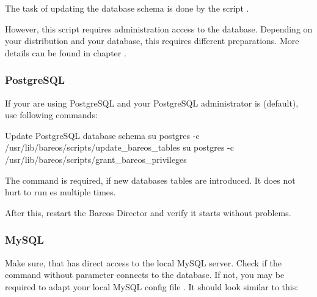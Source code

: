 The task of updating the database schema is done by the script
.

However, this script requires administration access to the database.
Depending on your distribution and your database, this requires different preparations.
More details can be found in chapter .


\subsubsection{PostgreSQL}
If your are using PostgreSQL and your PostgreSQL administrator is  (default), use following commands:

\begin{commands}{Update PostgreSQL database schema}
su postgres -c /usr/lib/bareos/scripts/update_bareos_tables
su postgres -c /usr/lib/bareos/scripts/grant_bareos_privileges
\end{commands}

The  command is required, if new databases tables are introduced. It does not hurt to run es multiple times.

After this, restart the Bareos Director and verify it starts without problems.

\subsubsection{MySQL}
Make sure, that  has direct access to the local MySQL server.
Check if the command  without parameter connects to the database.
If not, you may be required to adapt your local MySQL config file .
It should look similar to this:

